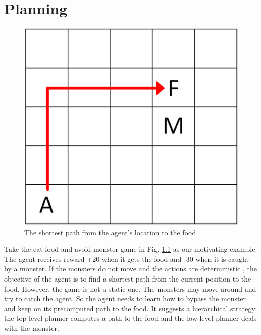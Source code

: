 \chapter{Planning}

\begin{figure}[h]
    \centering
    \begin{minipage}[t]{0.6\linewidth}
        \centering
        \includegraphics[width=\textwidth] {./figures/monsterPlan.eps}
    \end{minipage}
    \caption{The shortest path from the agent's location to the food}
    \label{fig:MonsterPlan}
\end{figure}

Take the eat-food-and-avoid-monster game in Fig. \ref{fig:MonsterPlan} as our motivating example. 
The agent receives reward +20 when it gets the food and -30 when it is caught by a monster.
If the monsters do not move and the actions are deterministic
, the objective of the agent is to find a shortest path from the current position to the food.
However, the game is not a static one. The monsters may move around and try to catch the agent.
So the agent needs to learn how to bypass the monster and keep on its precomputed path to the food.
It suggests a hierarchical strategy: the top level planner computes a path to the food and
the low level planner deals with the monster.

